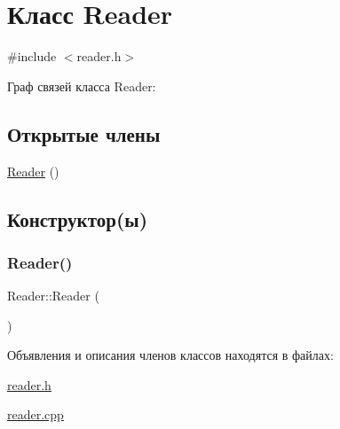 \hypertarget{class_reader}{}\section{Класс Reader}
\label{class_reader}


{\ttfamily \#include $<$reader.\+h$>$}



Граф связей класса Reader\+:
\subsection*{Открытые члены}
\begin{DoxyCompactItemize}
\item 
\hyperlink{class_reader_adcda31b507720ab44044d7a21686fba2}{Reader} ()
\end{DoxyCompactItemize}


\subsection{Конструктор(ы)}
\mbox{\label{class_reader_adcda31b507720ab44044d7a21686fba2}} 
\subsubsection{\texorpdfstring{Reader()}{Reader()}}
{\footnotesize\ttfamily Reader\+::\+Reader (\begin{DoxyParamCaption}{ }\end{DoxyParamCaption})}



Объявления и описания членов классов находятся в файлах\+:\begin{DoxyCompactItemize}
\item 
\hyperlink{reader_8h}{reader.\+h}\item 
\hyperlink{reader_8cpp}{reader.\+cpp}\end{DoxyCompactItemize}
